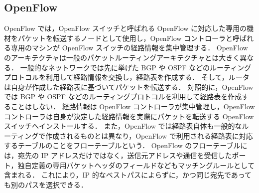 \subsection*{OpenFlow}
\label{sbsection:openflow}
OpenFlow では，OpenFlow スイッチと呼ばれる OpenFlow に対応した専用の機材をパケットを転送するノードとして使用し，OpenFlow コントローラと呼ばれる専用のマシンが OpenFlow スイッチの経路情報を集中管理する．
OpenFlow のアーキテクチャは一般のパケットルーティングアーキテクチャとは大きく異なる．
一般的なネットワークでは先に挙げた BGP や OSPF などのルーティングプロトコルを利用して経路情報を交換し，経路表を作成する．
そして，ルータは自身が作成した経路表に基づいてパケットを転送する．
対照的に，OpenFlow では BGP や OSPF などのルーティングプロトコルを利用して経路表を作成することはしない．
経路情報は OpenFlow コントローラが集中管理し，OpenFlow コントローラは自身が決定した経路情報を実際にパケットを転送する OpenFlow スイッチへインストールする．
また，OpenFlow では経路表自体も一般的なルーティングで作成されるものとは異なり，OpenFlow で利用される経路表に対応するテーブルのことをフローテーブルという．
OpenFlow のフローテーブルには，宛先の IP アドレスだけではなく，送信元アドレスや通信を受信したポート，独自定義の専用パケットヘッダのフィールドなどもマッチングルールとして含まれる．
これにより，IP 的なベストパスによらずに，かつ同じ宛先であっても別のパスを選択できる．

